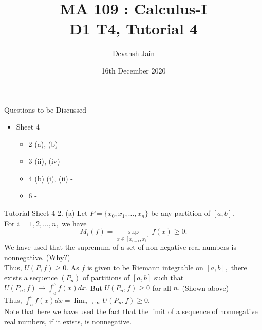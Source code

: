 \documentclass[aspectratio=169]{beamer}
\title{MA 109 : Calculus-I\\ D1 T4, Tutorial 4}
\author{Devansh Jain}
\date[16-12-2020]{16th December 2020}
\institute[IITB]{IIT Bombay}
\begin{document}
\begin{frame}
    \titlepage
\end{frame}

\begin{frame}{Questions to be Discussed}
    \begin{itemize}
        \item Sheet 4
            \begin{itemize}
                \item 2 (a), (b) -
                \item 3 (ii), (iv) - 
                \item 4 (b) (i), (ii) - 
                \item 6 - 
            \end{itemize}
    \end{itemize}
\end{frame}

\begin{frame}{Tutorial Sheet 4}
	2. (a) Let $P = \{x_0, x_1, \ldots, x_n\}$ be any partition of $[a, b].$\\
	For $i = 1, 2, \ldots, n,$ we have
	\[M_i(f) = \sup_{x \in [x_{i-1}, x_i]}f(x) \ge 0.\]
	We have used that the supremum of a set of non-negative real numbers is nonnegative. (Why?)\\
	Thus, $U(P, f) \ge 0.$ As $f$ is given to be Riemann integrable on $[a, b],$ there exists a sequence $(P_n)$ of partitions of $[a, b]$ such that $U(P_n, f) \to \displaystyle\int_{a}^{b} f(x) dx .$ But $U(P_n, f) \ge 0$ for all $n.$ (Shown above)\\
	Thus, $\displaystyle\int_{a}^{b} f(x) dx = \lim_{n\to \infty}U(P_n, f) \ge 0.$\\
	Note that here we have used the fact that the limit of a sequence of nonnegative real numbers, if it exists, is nonnegative.
\end{frame}
\end{document}
